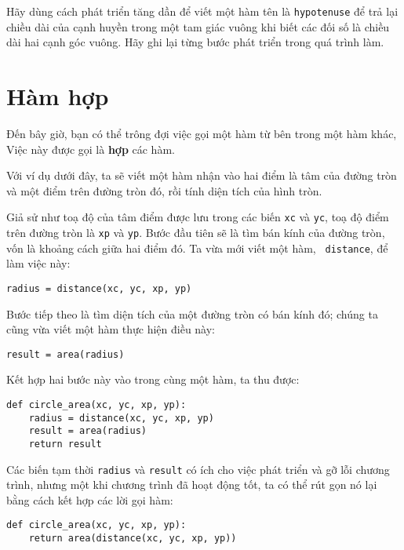 \documentclass[11pt]{book}
\begin{document}
\begin{ex}


Hãy dùng cách phát triển tăng dần để viết một hàm tên là {\tt hypotenuse} 
để trả lại chiều dài của cạnh huyền trong một tam giác vuông 
khi biết các đối số là chiều dài hai cạnh góc vuông. Hãy ghi lại từng bước
phát triển trong quá trình làm.
\end{ex}


\section{Hàm hợp}


Đến bây giờ, bạn có thể trông đợi việc gọi một hàm từ bên trong một
hàm khác, Việc này được gọi là {\bf hợp} các hàm.

Với ví dụ dưới đây, ta sẽ viết một hàm nhận vào hai điểm là tâm của
đường tròn và một điểm trên đường tròn đó, rồi tính diện tích của
hình tròn.

Giả sử như toạ độ của tâm điểm được lưu trong các biến {\tt xc} và 
{\tt yc}, toạ độ điểm trên đường tròn là {\tt xp} và {\tt yp}. Bước
đầu tiên sẽ là tìm bán kính của đường tròn, vốn là khoảng cách 
giữa hai điểm đó. Ta vừa mới viết một hàm, {\tt
distance}, để làm việc này:

\beforeverb
\begin{verbatim}
radius = distance(xc, yc, xp, yp)
\end{verbatim}
\afterverb
%
Bước tiếp theo là tìm diện tích của một đường tròn có bán kính đó;
chúng ta cũng vừa viết một hàm thực hiện điều này:

\beforeverb
\begin{verbatim}
result = area(radius)
\end{verbatim}
\afterverb
%
Kết hợp hai bước này vào trong cùng một hàm, ta thu được:


\beforeverb
\begin{verbatim}
def circle_area(xc, yc, xp, yp):
    radius = distance(xc, yc, xp, yp)
    result = area(radius)
    return result
\end{verbatim}
\afterverb
%
Các biến tạm thời {\tt radius} và {\tt result} có ích cho việc phát
triển và gỡ lỗi chương trình, nhưng một khi chương trình đã hoạt động tốt,
ta có thể rút gọn nó lại bằng cách kết hợp các lời gọi hàm:

\beforeverb
\begin{verbatim}
def circle_area(xc, yc, xp, yp):
    return area(distance(xc, yc, xp, yp))
\end{verbatim}
\afterverb
%
\end{document}
